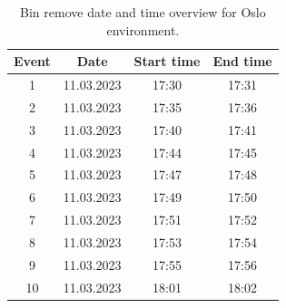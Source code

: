 \begin{table}[H]
\centering
\caption{Bin remove date and time overview for Oslo environment.}
\label{tab:BR_dateandtimeOslo}
\begin{tabular}{|c|c|c|c|}
\hline
\textbf{Event} & \textbf{Date} & \textbf{Start time} & \textbf{End time} \\ \hline
1              & 11.03.2023    & 17:30               & 17:31             \\ \hline
2              & 11.03.2023    & 17:35               & 17:36             \\ \hline
3              & 11.03.2023    & 17:40               & 17:41             \\ \hline
4              & 11.03.2023    & 17:44               & 17:45             \\ \hline
5              & 11.03.2023    & 17:47               & 17:48             \\ \hline
6              & 11.03.2023    & 17:49               & 17:50             \\ \hline
7              & 11.03.2023    & 17:51               & 17:52             \\ \hline
8              & 11.03.2023    & 17:53               & 17:54             \\ \hline
9              & 11.03.2023    & 17:55               & 17:56             \\ \hline
10             & 11.03.2023    & 18:01               & 18:02             \\ \hline
\end{tabular}
\end{table}

